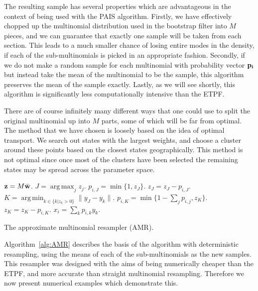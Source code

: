 \documentclass[final]{siamltex}
\renewcommand{\b}[1]{{\bf #1}}
\DeclareMathOperator*{\argmin}{arg\,min}
\DeclareMathOperator*{\argmax}{arg\,max}
\begin{document}
The resulting sample has several properties which are advantageous in
the context of being used with the PAIS algorithm. Firstly, we have
effectively chopped up the multinomial distribution used in the
bootstrap filter into $M$ pieces, and we can guarantee that exactly
one sample will be taken from each section. This leads to a much
smaller chance of losing entire modes in the density, if each of the
sub-multinomials is picked in an appropriate fashion. Secondly, if we do not make a random sample for
each multinomial with probability vector $\bf p_i$ but instead take
the mean of the multinomial to be the sample, this algorithm preserves
the mean of the sample exactly. Lastly, as we will see shortly, this
algorithm is significantly less computationally intensive than the
ETPF.

There are of course infinitely many different ways that one could use
to split the original multinomial up into $M$ parts, some of which
will be far from optimal. The method that we have chosen is loosely
based on the idea of optimal transport. We search out states with the
largest weights, and choose a cluster around these points based on
the closest states geographically. This method is not optimal since
once most of the clusters have been selected the remaining states
may be spread across the parameter space.

\begin{table}[!ht]
\centering
\begin{algorithm}[H]
\DontPrintSemicolon
\BlankLine
	$\b{z} = M\bar{\b{w}}$.\;
	{
		$J = \argmax_j z_j$.\;
		$p_{i,J} = \min\{1,z_J\}$.\;
		$z_J = z_J - p_{i,J}$.\;
		{
			$K = \argmin_{k \in \{k|z_k>0\}} \|y_J - y_k\|$.\;
			$p_{i,K} = \min\{1-\sum_j p_{i,j}, z_K\}$.\;
			$z_K = z_K - p_{i,K}$.\;
		}
		$x_i = \sum_k p_{i,k}y_k$.\;
	}
\caption{The approximate multinomial resampler (AMR).\label{alg:AMR}}
\end{algorithm}
\end{table}

Algorithm~\ref{alg:AMR} describes the basis of the algorithm with
deterministic resampling, using the means of each of the
sub-multinomials as the new samples. This resampler was designed with the aims of being
numerically cheaper than the ETPF, and more accurate than straight multinomial
resampling. Therefore we now present numerical examples which
demonstrate this.
\end{document}
